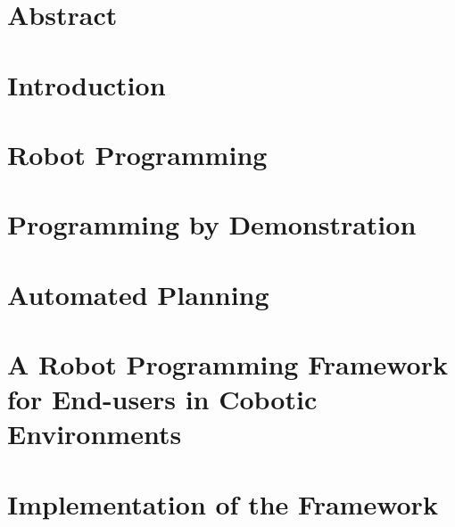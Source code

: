 \documentclass[a4paper,12pt,twoside,openany]{book}
\theoremstyle{definition}
\theoremstyle{remark}
\begin{document}

 \maketitle

%

\chapter*{Abstract}


\dominitoc%
\tableofcontents
\listoffigures


\chapter{Introduction} \label{chap:Intro}
\minitoc%


\chapter{Robot Programming}\label{chap:Sota}
\minitoc%

\chapter{Programming by Demonstration}\label{chap:Sota-PbD}
\minitoc%


\chapter{Automated Planning}\label{chap:Sota-AP}
\minitoc%


\chapter{A Robot Programming Framework for End-users in Cobotic Environments}\label{chap:Contribution}
\minitoc%


\chapter{Implementation of the Framework}\label{chap:Implementation}
\minitoc%

\end{document}
